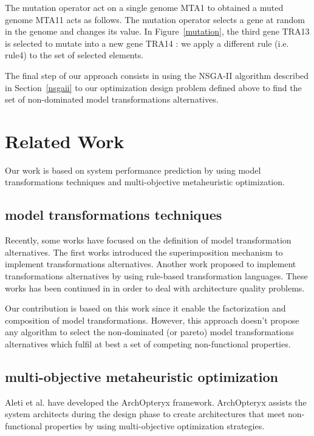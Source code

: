 \documentclass[conference]{IEEEtran}
\begin{document}
The mutation operator act on a single genome MTA1 to obtained a muted genome MTA11 acts as follows. The mutation operator selects a gene at random in the genome and changes its value. In Figure~\ref{mutation}, the third gene TRA13 is selected to mutate into a new gene TRA14 : we apply a different rule (i.e. rule4) to the set of selected elements.

The final step of our approach consists in using the NSGA-II algorithm described in Section~\ref{nsgaii} to our optimization design problem defined above to find the set of non-dominated model transformations alternatives.

\section{Related Work}
\label{Related}
Our work is based on system performance prediction\cite{1291833} by using model transformations techniques and multi-objective metaheuristic optimization\cite{Coello98acomprehensive}.

\subsection{model transformations techniques}
Recently, some works have focused on the definition of model transformation alternatives. The first works introduced the superimposition mechanism\cite{Navarro:2011:UMT:2041790.2041840} to implement transformations alternatives. Another work\cite{Kavimandan:2011:MQS:2000259.2000264} proposed to implement transformations alternatives by using rule-based transformation languages. These works has been continued in\cite{Drago:2011} in order to deal with architecture quality problems. 

Our contribution is based on this work since it enable the factorization and composition of model transformations. However, this approach doesn't propose any algorithm to select the non-dominated (or pareto) model transformations alternatives which fulfil at best a set of competing non-functional properties.

\subsection{multi-objective metaheuristic optimization}
Aleti et al.\cite{Gr5069138} have developed the ArchOpteryx framework. ArchOpteryx assists the system architects during the design phase to create architectures that meet non-functional properties by using multi-objective optimization strategies. 
\end{document}
